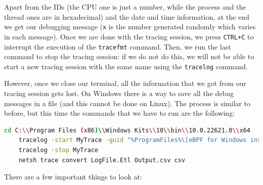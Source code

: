 Apart from the IDs (the CPU one is just a number, while the process and the thread ones are in hexadecimal) and the date and time information, at the end we get our debugging message (\colorbox{backcolour}{\lstinline[style=commandline, language=bash, breaklines=true]|x|} is the number generated randomly which varies in each message).
Once we are done with the tracing session, we press \colorbox{backcolour}{\lstinline[style=commandline, language=bash, breaklines=true]|CTRL+C|} to interrupt the execution of the \colorbox{backcolour}{\lstinline[style=commandline, language=bash, breaklines=true]|tracefmt|} command.
Then, we run the last command to stop the tracing session: if we do not do this, we will not be able to start a new tracing session with the same name using the \colorbox{backcolour}{\lstinline[style=commandline, language=bash, breaklines=true]|tracelog|} command.

However, once we close our terminal, all the information that we got from our tracing session gets lost.
On Windows there is a way to save all the debug messages in a file (and this cannot be done on Linux).
The process is similar to before, but this time the commands that we have to run are the following:

\begin{lstlisting}[style=commandline, language=bash, caption={Commands for kernel debugging using \colorbox{backcolour}{\lstinline[style=commandline, language=bash]|tracelog|}.}]
	cd C:\\Program Files (x86)\\Windows Kits\\10\\bin\\10.0.22621.0\\x64
	tracelog -start MyTrace -guid "%ProgramFiles%\[eBPF for Windows install folder]\ebpf-printk.guid" -kd
	tracelog -stop MyTrace
	netsh trace convert LogFile.Etl Output.csv csv
\end{lstlisting}

There are a few important things to look at:


